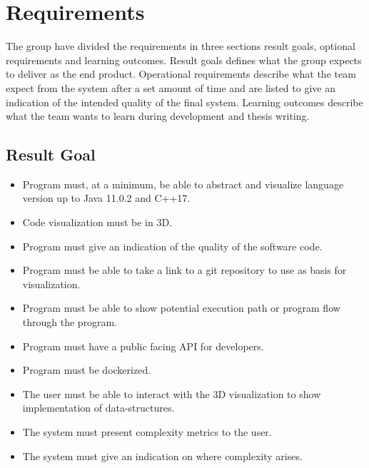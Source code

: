 \chapter{Requirements}
\label{chap:requirements}

The group have divided the requirements in three sections result goals, optional requirements and learning outcomes. Result goals defines what the group expects to deliver as the end product. Operational requirements describe what the team expect from the system after a set amount of time and are listed to give an indication of the intended quality of the final system. Learning outcomes describe what the team wants to learn during development and thesis writing.

\section{Result Goal}
    \begin{itemize}
        \item Program must, at a minimum, be able to abstract and visualize language version up to Java 11.0.2 and C++17.
        \item Code visualization must be in 3D.
        \item Program must give an indication of the quality of the software code.  
        \item Program must be able to take a link to a git repository to use as basis for visualization.
        \item Program must be able to show potential execution path or program flow through the program.
        \item Program must have a public facing API for developers.
        \item Program must be dockerized. 
        \item The user must be able to interact with the 3D visualization to show implementation of data-structures.
        \item The system must present complexity metrics to the user.
        \item The system must give an indication on where complexity arises.
    \end{itemize}
    
